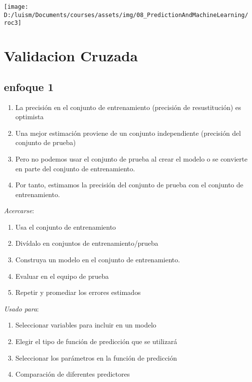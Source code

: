 \documentclass[
]{article}
\providecommand{\tightlist}{%
  \setlength{\itemsep}{0pt}\setlength{\parskip}{0pt}}
\begin{document}
\begin{center}\texttt{[image: D:/luism/Documents/courses/assets/img/08\_PredictionAndMachineLearning/roc3]} \end{center}

\hypertarget{validacion-cruzada}{%
\section{Validacion Cruzada}\label{validacion-cruzada}}

\hypertarget{enfoque-1}{%
\subsection{enfoque 1}\label{enfoque-1}}

\begin{enumerate}
\def\labelenumi{\arabic{enumi}.}
\tightlist
\item
  La precisión en el conjunto de entrenamiento (precisión de
  resustitución) es optimista
\item
  Una mejor estimación proviene de un conjunto independiente (precisión
  del conjunto de prueba)
\item
  Pero no podemos usar el conjunto de prueba al crear el modelo o se
  convierte en parte del conjunto de entrenamiento.
\item
  Por tanto, estimamos la precisión del conjunto de prueba con el
  conjunto de entrenamiento.
\end{enumerate}

\emph{Acercarse}:

\begin{enumerate}
\def\labelenumi{\arabic{enumi}.}
\item
  Usa el conjunto de entrenamiento
\item
  Divídalo en conjuntos de entrenamiento/prueba
\item
  Construya un modelo en el conjunto de entrenamiento.
\item
  Evaluar en el equipo de prueba
\item
  Repetir y promediar los errores estimados
\end{enumerate}

\emph{Usado para}:

\begin{enumerate}
\def\labelenumi{\arabic{enumi}.}
\item
  Seleccionar variables para incluir en un modelo
\item
  Elegir el tipo de función de predicción que se utilizará
\item
  Seleccionar los parámetros en la función de predicción
\item
  Comparación de diferentes predictores
\end{enumerate}
\end{document}
